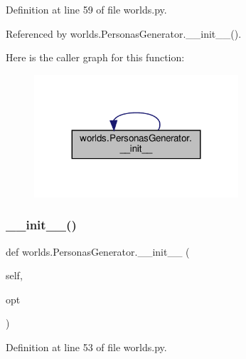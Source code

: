 Definition at line 59 of file worlds.\+py.



Referenced by worlds.\+Personas\+Generator.\+\_\+\+\_\+init\+\_\+\+\_\+().

Here is the caller graph for this function\+:
\nopagebreak
\begin{figure}[H]
\begin{center}
\leavevmode
\includegraphics[width=215pt]{classworlds_1_1PersonasGenerator_a8de0721e02fce900b4f3c15f6cf0e2e1_icgraph}
\end{center}
\end{figure}
\mbox{\label{classworlds_1_1PersonasGenerator_a8de0721e02fce900b4f3c15f6cf0e2e1}} 
\subsubsection{\texorpdfstring{\+\_\+\+\_\+init\+\_\+\+\_\+()}{\_\_init\_\_()}\hspace{0.1cm}{\footnotesize\ttfamily [2/2]}}
{\footnotesize\ttfamily def worlds.\+Personas\+Generator.\+\_\+\+\_\+init\+\_\+\+\_\+ (\begin{DoxyParamCaption}\item[{}]{self,  }\item[{}]{opt }\end{DoxyParamCaption})}



Definition at line 53 of file worlds.\+py.



